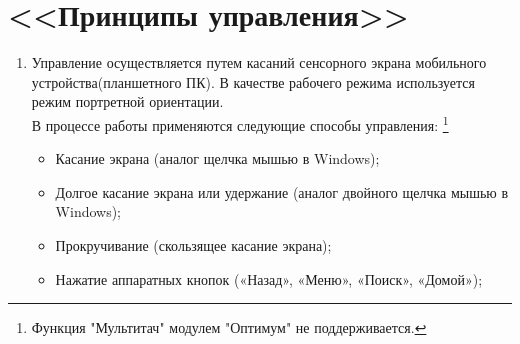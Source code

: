 \section{<<Принципы управления>>}
\begin{enumerate}[\thesection .1]
	\item Управление осуществляется путем касаний сенсорного экрана мобильного устройства(планшетного ПК). В качестве рабочего режима используется режим портретной ориентации.\\
	В процессе работы применяются следующие способы управления: \footnote{Функция "Мультитач" модулем "Оптимум" не поддерживается.}
	\begin{itemize}
		
		\item Касание экрана (аналог щелчка мышью в Windows);
		\item Долгое касание экрана или удержание (аналог двойного щелчка мышью в Windows); 
		\item Прокручивание (скользящее касание экрана); 
		\item Нажатие аппаратных кнопок («Назад», «Меню», «Поиск», «Домой»);
	\end{itemize}
\end{enumerate}